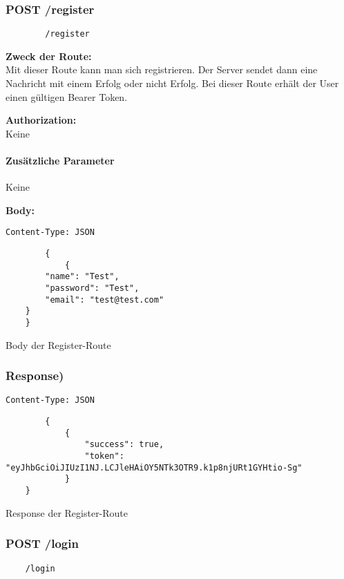 
\subsubsection{POST /register}

\begin{lstlisting}
        /register
    \end{lstlisting}


\textbf{Zweck der Route:} \\
Mit dieser Route kann man sich registrieren. Der Server
sendet dann eine Nachricht mit einem Erfolg oder nicht Erfolg.
Bei dieser Route erhält der User einen gültigen Bearer Token.

\textbf{Authorization:} \\
Keine

\paragraph{Zusätzliche Parameter}
Keine

\textbf{Body:}
\begin{code}
    \lstinline{Content-Type: JSON}
    \begin{lstlisting}
        {
            {
        "name": "Test",
        "password": "Test",
        "email": "test@test.com"
    }  
    }
    \end{lstlisting}
    \caption{Body der Register-Route}
\end{code}

\subsubsection{Response)}

\begin{code}
    \lstinline{Content-Type: JSON}
    \begin{lstlisting}
        {
            {
                "success": true,
                "token": "eyJhbGciOiJIUzI1NJ.LCJleHAiOY5NTk3OTR9.k1p8njURt1GYHtio-Sg"
            }
    }
    \end{lstlisting}
    \caption{Response der Register-Route}
\end{code}

\pagebreak

\subsubsection{POST /login}

\begin{lstlisting}
    /login
\end{lstlisting}


